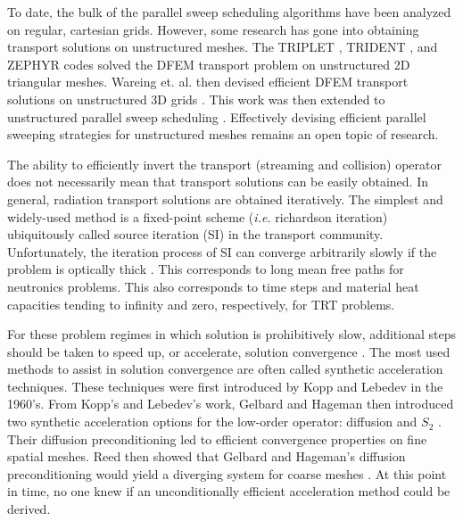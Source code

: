 \documentclass[11pt]{article}
\begin{document}
To date, the bulk of the parallel sweep scheduling algorithms have been analyzed on regular, cartesian grids. However, some research has gone into obtaining transport solutions on unstructured meshes. The TRIPLET \cite{reed1973triplet}, TRIDENT \cite{seed1978trident}, and ZEPHYR \cite{mordant1981some} codes solved the DFEM transport problem on unstructured 2D triangular meshes. Wareing et. al. then devised efficient DFEM transport solutions on unstructured 3D grids \cite{wareing2001discontinuous}. This work was then extended to unstructured parallel sweep scheduling \cite{pautz2002algorithm,zeyao2004parallel,mathis2004performance}. Effectively devising efficient parallel sweeping strategies for unstructured meshes remains an open topic of research.

The ability to efficiently invert the transport (streaming and collision) operator does not necessarily mean that transport solutions can be easily obtained. In general, radiation transport solutions are obtained iteratively. The simplest and widely-used method is a fixed-point scheme ({\em i.e.} richardson iteration) ubiquitously called source iteration (SI) in the transport community. Unfortunately, the iteration process of SI can converge arbitrarily slowly if the problem is optically thick \cite{ref::adams_larsen_iter_methods}. This corresponds to long mean free paths for neutronics problems. This also corresponds to time steps and material heat capacities tending to infinity and zero, respectively, for TRT problems.

For these problem regimes in which solution is prohibitively slow, additional steps should be taken to speed up, or accelerate, solution convergence \cite{ref::adams_larsen_iter_methods}. The most used methods to assist in solution convergence are often called synthetic acceleration techniques. These techniques were first introduced by Kopp  \cite{kopp1963synthetic} and Lebedev \cite{lebedevI,lebedevII,lebedevIII,lebedevIV,lebedevV,lebedevVI,lebedevVII} in the 1960's. From Kopp's and Lebedev's work, Gelbard and Hageman then introduced two synthetic acceleration options for the low-order operator: diffusion and $S_2$ \cite{gelbard1969synthetic}. Their diffusion preconditioning led to efficient convergence properties on fine spatial meshes. Reed then showed that Gelbard and Hageman's diffusion preconditioning would yield a diverging system for coarse meshes \cite{reed1971effectiveness}. At this point in time, no one knew if an unconditionally efficient acceleration method could be derived.
\end{document}
